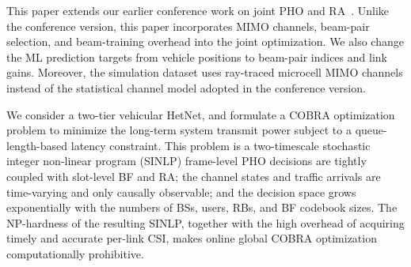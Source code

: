 \documentclass[conference, a4paper]{IEEEtran}
\newcommand{\rev}[1]{\textcolor{revisioncolor}{{}#1}}
\newif\ifshowdeletions
\newcommand{\currentdel}[1]{\ifshowdeletions\textcolor{deletioncolor}{\sout{#1}}\fi}
\theoremstyle{remark}
\begin{document}




\rev{This paper extends our earlier conference work on joint PHO and RA~\cite{AEPHORA2025ICC}.
Unlike the conference version, this paper incorporates MIMO channels, beam-pair selection, and beam-training overhead into the joint optimization.
We also change the ML prediction targets from vehicle positions to beam-pair indices and link gains.
Moreover, the simulation dataset uses ray-traced microcell MIMO channels instead of the statistical channel model adopted in the conference version.}

We consider a two-tier vehicular HetNet, and formulate a COBRA optimization problem to minimize the long-term system transmit power subject to a queue-length-based latency constraint. 
This problem is a two-timescale stochastic integer non-linear program (SINLP)\currentdel{: the} frame-level PHO decisions are tightly coupled with slot-level BF and RA; the channel states and traffic arrivals are time-varying and only causally observable; and the decision space grows exponentially with the numbers of BSs, users, RBs, and BF codebook sizes. 
The NP-hardness of the resulting SINLP, together with the high overhead of acquiring timely and accurate per-link CSI, makes online global COBRA optimization computationally prohibitive.
\end{document}
